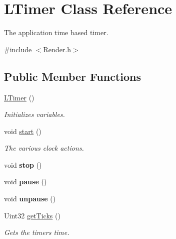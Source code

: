 \hypertarget{class_l_timer}{}\section{L\+Timer Class Reference}
\label{class_l_timer}


The application time based timer.  




{\ttfamily \#include $<$Render.\+h$>$}

\subsection*{Public Member Functions}
\begin{DoxyCompactItemize}
\item 
\mbox{\label{class_l_timer_a95bb9588b09c253f331881fa5dd3ce62}} 
\hyperlink{class_l_timer_a95bb9588b09c253f331881fa5dd3ce62}{L\+Timer} ()
\begin{DoxyCompactList}\small\item\em Initializes variables. \end{DoxyCompactList}\item 
\mbox{\label{class_l_timer_a7dc11f05cf5098a6d06ebd6ebec96ed6}} 
void \hyperlink{class_l_timer_a7dc11f05cf5098a6d06ebd6ebec96ed6}{start} ()
\begin{DoxyCompactList}\small\item\em The various clock actions. \end{DoxyCompactList}\item 
\mbox{\label{class_l_timer_aeabbf5f935907fcfeaa7f4403741e4ae}} 
void {\bfseries stop} ()
\item 
\mbox{\label{class_l_timer_a8a6c6af5435bdaa825a30f84877dc059}} 
void {\bfseries pause} ()
\item 
\mbox{\label{class_l_timer_a67a946bffb25cf5eb8ab430ffb5f7cec}} 
void {\bfseries unpause} ()
\item 
\mbox{\label{class_l_timer_a57c4bdca0f7bdd75c65b6ab1499de1e7}} 
Uint32 \hyperlink{class_l_timer_a57c4bdca0f7bdd75c65b6ab1499de1e7}{get\+Ticks} ()
\begin{DoxyCompactList}\small\item\em Gets the timer\textquotesingle{}s time. \end{DoxyCompactList}\item 

\end{DoxyCompactItemize}
